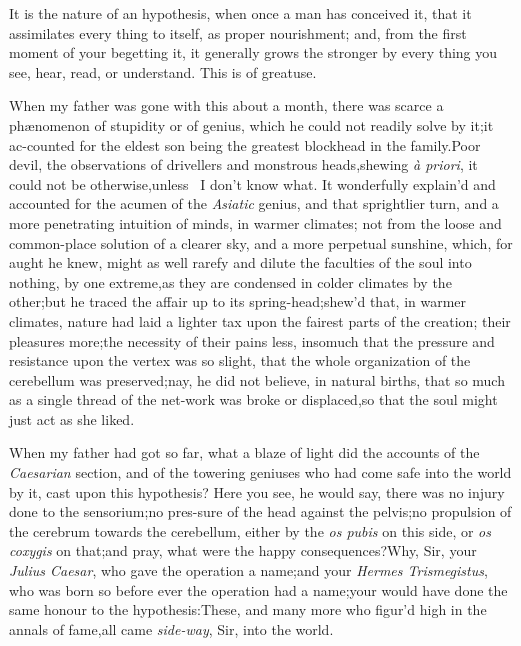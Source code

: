 \documentclass{article}
\begin{document}
It is the nature of an hypothesis, when once a man has conceived
it, that it assimilates every thing to itself, as proper
nourishment; and, from the first moment of your begetting it, it
generally grows the stronger by every thing you see, hear, read, or
understand. This is of great\break use.

\newpage
When my father was gone with this about a month, there was
scarce a phæ\-nomenon of stupidity or of genius, which he could
not readily solve by it;\tsk it ac-\break counted for the eldest son
being the greatest blockhead in the family.\tsk Poor
devil, 
the observations of drivellers and monstrous heads,\tsk shewing \textit{à
priori}, it could not be otherwise,\tsk unless \astiv\ I
don’t know what. It wonderfully explain’d and accounted for
the acumen of the \textit{Asiatic} genius, and that sprightlier turn,
and a more penetrating intuition of minds, in warmer climates; not
from the loose and common-place solution of a clearer sky, and a
more perpetual sunshine, \etc\tsk\break which, for aught he knew,
might as well rarefy and dilute the faculties of the soul into
nothing, by one extreme,\tsk as they\pb
are condensed in colder climates by the other;\tsh but he traced the affair up to
its spring-head;\tsk shew’d that, in warmer climates, nature had laid a lighter tax
upon the fairest parts of the creation;\tsk\break
their pleasures more;\tsk the necessity of their pains less, insomuch that the
pressure and resistance upon the vertex was so slight, that the whole organization
of the cerebellum was preserved;\tsh nay, he did not believe, in natural births,
that so much as a single thread of the net-work was broke or displaced,\tsh so that
the soul might just act as she liked.

\enlargethispage{\baselineskip}
When my father had got so far,\tsh\break
what a blaze of light did the accounts of the \textit{Caesarian} section, and of the
towering geniuses who had come safe into the world by it, cast upon
this hypothesis? Here you see, he would say, there was no injury
done to the sensorium;\tsk no pres-\pb sure of the head against the
pelvis;\tsh no propulsion of the cerebrum towards the
cerebellum, either by the \textit{os pubis} on this side, or \textit{os
coxygis} on that;\tsk and pray, what were the happy
consequences?\break Why, Sir, your \textit{Julius Caesar}, who gave the
operation a name;\tsk and your \textit{Hermes Trismegistus}, who
was born so before ever the operation had a name;\tsk your
would have done
the same honour to the hypothesis:\tsk These, and many
more who figur’d high in the annals of fame,\tsk all came
\textit{side-way}, Sir, into the world.
\end{document}
